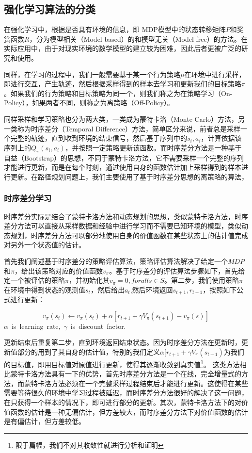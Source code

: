 \documentclass{standalone}
\begin{document}
\subsection{强化学习算法的分类}
在强化学习中，根据是否具有环境的信息，即 MDP模型中的状态转移矩阵$P$和奖赏函数$R$，分为模型相关（Model-based）的和模型无关（Model-free）的方法。在实际应用中，由于对现实环境的数学模型的建立较为困难，因此后者更被广泛的研究和使用。\par
同样，在学习的过程中，我们一般需要基于某一个行为策略$\mu$在环境中进行采样，即进行交互，产生轨迹，然后根据采样得到的样本去学习和更新我们的目标策略$\pi$。如果我们的行为策略和目标策略为同一个，则我们称之为在策略学习（On-Policy），如果两者不同，则称之为离策略（Off-Policy）。\par
同样采样和学习策略也分为两大类，一类成为蒙特卡洛（Monte-Carlo）方法，另一类称为时序差分（Temporal Difference）方法，简单区分来说，前者总是采样一个完整的轨迹，直到收到环境的结束信号，然后基于序列中的$s_i, a_i$，计算依据该序列上的$Q_{\pi}(s_i, a_i)$，并按照一定策略更新该函数。而时序差分方法是一种基于自益（Bootstrap）的思想，不同于蒙特卡洛方法，它不需要采样一个完整的序列才能进行更新，而是在每个时刻，通过使用自身的函数估计加上采样得到的样本进行更新。在路径规划问题上，我们主要使用了基于时序差分思想的离策略的算法，
\subsubsection{时序差分学习}
时序差分实际是结合了蒙特卡洛方法和动态规划的思想，类似蒙特卡洛方法，时序差分方法可以直接从采样数据和经验中进行学习而不需要已知环境的模型，类似动态规划，时序差分方法可以部分地使用自身的价值函数在某些状态上的估计值完成对另外一个状态值的估计。\par
首先我们阐述基于时序差分的策略评估算法，策略评估算法解决了给定一个$MDP$和$\pi$，给出该策略对应的价值函数$v_{\pi}$。基于时序差分的评估算法步骤如下，首先给定一个被评估的策略$\pi$，并初始化其$v_{\pi} = 0, for all s \in S$。第二步，我们使用策略$\pi$在环境中得到状态的观测值$s_t$，然后给出$a_t$,然后环境返回$s_{t+1}, r_{t+1}$，按照如下公式进行更新：
\begin{center}
    \begin{equation}
        v_{\pi}(s_t) \leftarrow v_{\pi}(s_t) + \alpha[r_{t+1} + \gamma V_{\pi}(s_{t+1}) - v_{\pi}(s)]
    \end{equation}
    \mbox{$\alpha$ is learning rate, $\gamma$ is discount factor.}
\end{center}
更新结束后重复第二步，直到环境返回结束状态。因为时序差分方法在更新时，更新值部分的用到了其自身的估计值，特别的我们定义$\alpha[r_{t+1} + \gamma V_{\pi}(s_{t+1})$为我们的目标值，即用目标值对原值进行更新，使得其逐渐收敛到真实值\footnote{限于篇幅，我们不对其收敛性就进行分析和证明}。
这类方法相比蒙特卡洛方法具有一下的优势，首先时序差分方法是一个在线，完全增量式的方法，而蒙特卡洛方法必须在一个完整采样过程结束后才能进行更新。这使得在某些需要等待很久的环境中学习过程被延迟，而时序差分方法很好的解决了这一问题，在只获得一个样本的情况下，即可进行部分的更新。其次，蒙特卡洛方法下的对价值函数的估计是一种无偏估计，但方差较大，而时序差分方法下对价值函数的估计是有偏估计，但方差较低。
\end{document}
